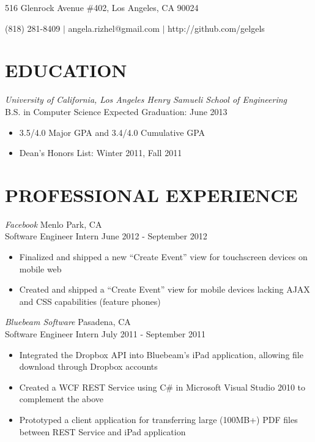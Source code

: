 \documentclass{res}
\begin{document}

\begin{resume}
\centerline{516 Glenrock Avenue \#402, Los Angeles, CA 90024}
\centerline{(818) 281-8409 $|$ angela.rizhel@gmail.com $|$ http://github.com/gelgels }
\vspace{-4pt}

\section{EDUCATION}
\vspace{6pt}
{\sl{University of California}, Los Angeles \hfill Henry Samueli School of Engineering} \\
B.S. in Computer Science \hfill Expected Graduation: June 2013

\begin{itemize} \itemsep -2pt %
  \item 3.5/4.0 Major GPA and 3.4/4.0 Cumulative GPA
  \item Dean's Honors List: Winter 2011, Fall 2011
\end{itemize} \vspace{-6pt}

\section{PROFESSIONAL EXPERIENCE}
\vspace{6pt}
  {\sl Facebook} \hfill Menlo Park, CA \\
  Software Engineer Intern \hfill June 2012 - September 2012

   \begin{itemize} \itemsep -2pt %
     \item Finalized and shipped a new ``Create Event'' view for touchscreen devices on mobile web
     \item Created and shipped a ``Create Event'' view for mobile devices lacking AJAX and CSS capabilities (feature phones)
   \end{itemize} \vspace{-6pt}

 {\sl Bluebeam Software} \hfill Pasadena, CA \\
 Software Engineer Intern \hfill July 2011 - September 2011

   \begin{itemize} \itemsep -2pt
   \item Integrated the Dropbox API into Bluebeam's iPad application, allowing file download through Dropbox accounts
   \item Created a WCF REST Service using C\# in Microsoft Visual Studio 2010 to complement the above
   \item Prototyped a client application for transferring large (100MB+) PDF files between  REST Service and iPad application
   \end{itemize} \vspace{-12pt}


\end{resume}
\end{document}
